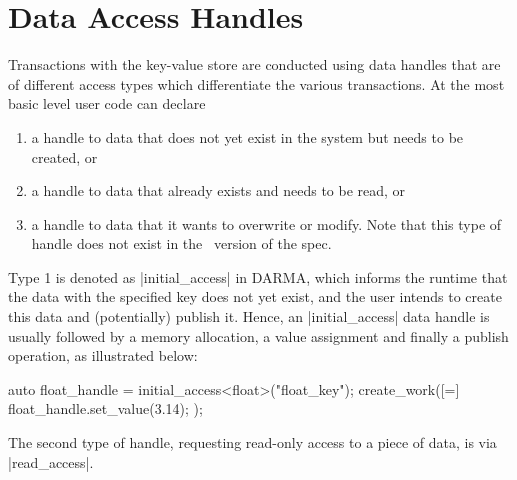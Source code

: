 \lstMakeShortInline[style=CppCodeInlineStyle]{\|}
\section{Data Access Handles}
\label{sec:handles}


Transactions with the \gls{key-value store} are conducted using data handles 
that are of different access types which differentiate the various transactions. 
At the most basic level user code can declare 
\begin{enumerate}
\item a handle to data that does not yet exist in the system
but needs to be created, or
\item a handle to data that already exists and needs to
be read, or 
\item a handle to data that it wants to overwrite or modify. 
Note that this type of handle does not exist in the \specVersion\ version of the spec.
\end{enumerate}

Type 1 is denoted as |initial_access| in DARMA, 
which informs the runtime that the data with the 
specified key does not yet exist, and the user intends to 
create this data and (potentially) publish it.
Hence, an |initial_access| data handle is usually 
followed by a memory allocation, a value assignment and 
finally a publish operation, as illustrated below: 

\begin{CppCode}
auto float_handle = initial_access<float>("float_key");
create_work([=]{
  float_handle.set_value(3.14);
});
\end{CppCode}
The second type of handle, requesting read-only access 
to a piece of data, is via |read_access|. 


